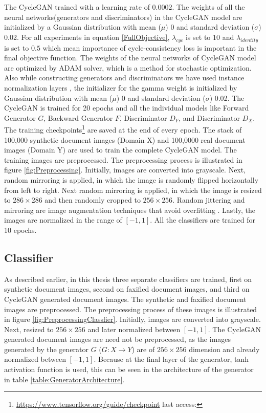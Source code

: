 The \ac{CycleGAN} trained with a learning rate of $0.0002$. The weights of all the neural networks(generators and discriminators) in the \ac{CycleGAN} model are initialized by a Gaussian distribution with mean ($\mu$) 0 and standard deviation ($\sigma$) 0.02. For all experiments in equation \ref{FullObjective}, $\lambda_{cyc}$ is set to $10$ and $\lambda_{identity}$ is set to $0.5$ which mean importance of cycle-consistency loss is important in the final objective function. The weights of the neural networks of \ac{CycleGAN} model are optimized by ADAM solver, which is a method for stochastic optimization\cite{kingma2017adam}. Also while constructing generators and discriminators we have used instance normalization layers \cite{ulyanov2017instance}, the initializer for the gamma weight is initialized by Gaussian distribution with mean ($\mu$) 0 and standard deviation ($\sigma$) 0.02. The \ac{CycleGAN} is trained for 20 epochs and all the individual models like Forward Generator $G$, Backward Generator $F$, Discriminator $D_Y$, and Discriminator $D_X$. The training checkpoints\footnote{\url{https://www.tensorflow.org/guide/checkpoint} last access: \dcdate} are saved at the end of every epoch. The stack of 100,000 synthetic document images (Domain X) and 100,0000 real document images (Domain Y) are used to train the complete \ac{CycleGAN} model. The training images are preprocessed. The preprocessing process is illustrated in figure \ref{fig:Preprocessing}. Initially, images are converted into grayscale. Next, random mirroring is applied, in which the image is randomly flipped horizontally from left to right. Next random mirroring is applied, in which the image is resized to $286 \times 286$ and then randomly cropped to $256 \times 256$. Random jittering and mirroring are image augmentation techniques that avoid overfitting \cite{zhu2020unpaired}. Lastly, the images are normalized in the range of $[-1, 1]$. All the classifiers are trained for 10 epochs.



\subsection{Classifier}

As described earlier, in this thesis three separate classifiers are trained, first on synthetic document images, second on faxified document images, and third on \ac{CycleGAN} generated document images. The synthetic and faxified document images are preprocessed. The preprocessing process of these images is illustrated in figure \ref{fig:PreprocessingClassfier}. Initially, images are converted into grayscale. Next, resized to $256 \times 256$ and later normalized between $[-1, 1]$. The \ac{CycleGAN} generated document images are need not be preprocessed, as the images generated by the generator $G$ ($G : X \rightarrow Y$) are of $256 \times 256$ dimension and already normalized between $[-1, 1]$. Because at the final layer of the generator, tanh activation function is used, this can be seen in the architecture of the generator in table \ref{table:GeneratorArchitecture}.

